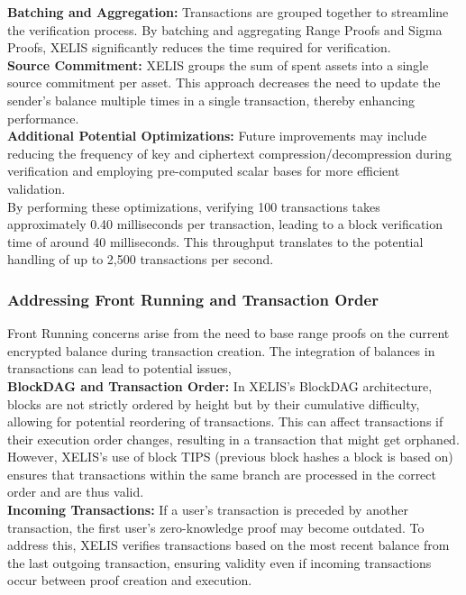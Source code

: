 \documentclass[12pt,a4paper,twocolumn]{article}
\begin{document}
\textbf{Batching and Aggregation:} Transactions are grouped together to streamline the verification process. By batching and aggregating Range Proofs and Sigma Proofs, XELIS significantly reduces the time required for verification.\\

\textbf{Source Commitment:} XELIS groups the sum of spent assets into a single source commitment per asset. This approach decreases the need to update the sender's balance multiple times in a single transaction, thereby enhancing performance.\\

\textbf{Additional Potential Optimizations:} Future improvements may include reducing the frequency of key and ciphertext compression/decompression during verification and employing pre-computed scalar bases for more efficient validation.\\

By performing these optimizations, verifying 100 transactions takes approximately 0.40 milliseconds per transaction, leading to a block verification time of around 40 milliseconds. This throughput translates to the potential handling of up to 2,500 transactions per second.

\subsubsection{Addressing Front Running and Transaction Order}

Front Running concerns arise from the need to base range proofs on the current encrypted balance during transaction creation. The integration of balances in transactions can lead to potential issues,\\

\textbf{BlockDAG and Transaction Order:} In XELIS's BlockDAG architecture, blocks are not strictly ordered by height but by their cumulative difficulty, allowing for potential reordering of transactions. This can affect transactions if their execution order changes, resulting in a transaction that might get orphaned. However, XELIS’s use of block TIPS (previous block hashes a block is based on) ensures that transactions within the same branch are processed in the correct order and are thus valid.\\

\textbf{Incoming Transactions:} If a user's transaction is preceded by another transaction, the first user’s zero-knowledge proof may become outdated. To address this, XELIS verifies transactions based on the most recent balance from the last outgoing transaction, ensuring validity even if incoming transactions occur between proof creation and execution.\\
\end{document}
